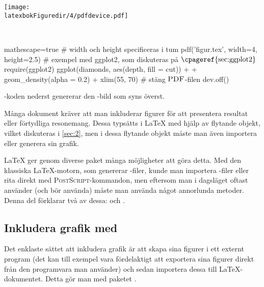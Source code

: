 \documentclass[lang=sv,ptsize=10pt,font=none,nomath,titles=bf,../../a4.tex]{subfiles}
\begin{document}
\begin{kod}[tbp]
	\centering
	\begin{minipage}{\textwidth}
		\centering
		\texttt{[image: \\latexbokFiguredir/4/pdfdevice.pdf]}
	\end{minipage}
	\\[1ex]
	\begin{minipage}{\textwidth}
		\begin{rcode*}{mathescape=true}
# width och height specificeras i tum
pdf('figur.tex', width=4, height=2.5)
# exempel med ggplot2, som diskuteras på $\text{\cpageref{sec:ggplot2}}$
require(ggplot2)
ggplot(diamonds, aes(depth, fill = cut)) +
  + geom_density(alpha = 0.2) + xlim(55, 70)
# stäng $\text{\textsc{PDF}}$-filen
dev.off()
		\end{rcode*}
	\end{minipage}
	\caption{\Rlogo-koden nederst genererar den \PDF-bild som
	syns överst.}
	\label{ex:pdfdevice}
\end{kod}


\iffalse
Många dokument kräver att man inkluderar figurer för att presentera
resultat eller förtydliga resonemang. Dessa typsätts i \LaTeX{} med hjälp
av flytande objekt, vilket diskuteras i \cref{sec:2}, men i dessa
flytande objekt måste man även importera eller generera sin grafik.

\LaTeX{} ger genom diverse paket många möjligheter att göra detta. Med den
klassiska \LaTeX{}-motorn, som genererar \DVI-filer, kunde man importera
\EPS-filer eller rita direkt med \textsc{PostScript}-kommandon, men
eftersom man i dagsläget oftast använder (och bör använda) \pdfLaTeX{}
måste man använda något annorlunda metoder. Denna del förklarar två av
dessa:  och \PGFTikZ.

\subsection{Inkludera grafik med }
Det enklaste sättet att inkludera grafik är att skapa sina figurer i ett
externt program (det kan till exempel vara fördelaktigt att exportera sina
figurer direkt från den programvara man använder) och sedan importera
dessa till \LaTeX{}-dokumentet. Detta gör man med paketet .
\end{document}
